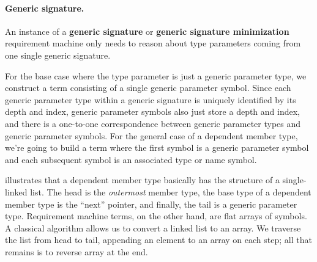 \documentclass[../generics]{subfiles}
\begin{document}
\paragraph{Generic signature.}
%
%
%
%
An instance of a \textbf{generic signature} or \textbf{generic signature minimization} requirement machine only needs to reason about type parameters coming from one single generic signature.

For the base case where the type parameter is just a generic parameter type, we construct a term consisting of a single generic parameter symbol. Since each generic parameter type within a generic signature is uniquely identified by its depth and index, generic parameter symbols also just store a depth and index, and there is a one-to-one correspondence between generic parameter types and generic parameter symbols. 
For the general case of a dependent member type, we're going to build a term where the first symbol is a generic parameter symbol and each subsequent symbol is an associated type or name symbol.

%
%
%
%
%
%
 illustrates that a dependent member type basically has the structure of a single-linked list. The head is the \emph{outermost} member type, the base type of a dependent member type is the ``next'' pointer, and finally, the tail is a generic parameter type. Requirement machine terms, on the other hand, are flat arrays of symbols. A classical algorithm allows us to convert a linked list to an array. We traverse the list from head to tail, appending an element to an array on each step; all that remains is to reverse array at the end.
\end{document}
